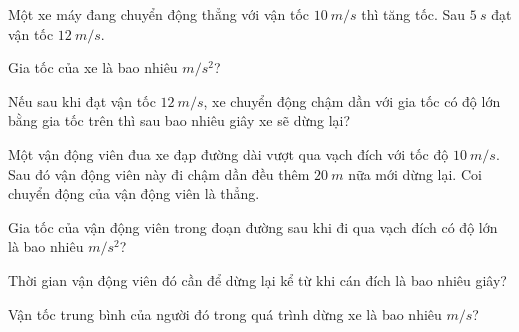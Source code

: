 \begin{vidu}
Một xe máy đang chuyển động thẳng với vận tốc $10\ m/s$ thì tăng tốc. Sau $5\ s$ đạt vận tốc $12\ m/s$.
\begin{vdc}
Gia tốc của xe là bao nhiêu $m/s^2$?
\end{vdc}
\begin{vdc}
Nếu sau khi đạt vận tốc $12\ m/s$, xe chuyển động chậm dần với gia tốc có độ lớn bằng gia tốc trên thì sau bao nhiêu giây xe sẽ dừng lại?
\end{vdc}
\end{vidu}
\begin{vidu}
Một vận động viên đua xe đạp đường dài vượt qua vạch đích với tốc độ $10\ m/s$. Sau đó vận động viên này đi chậm dần đều thêm $20\ m$ nữa mới dừng lại. Coi chuyển động của vận động viên là thẳng.
\begin{vdc}
Gia tốc của vận động viên trong đoạn đường sau khi đi qua vạch đích có độ lớn là bao nhiêu $m/s^2$?
\end{vdc}
\begin{vdc}
Thời gian vận động viên đó cần để dừng lại kể từ khi cán đích là bao nhiêu giây?
\end{vdc}
\begin{vdc}
Vận tốc trung bình của người đó trong quá trình dừng xe là bao nhiêu $m/s$?
\end{vdc}
\end{vidu}





